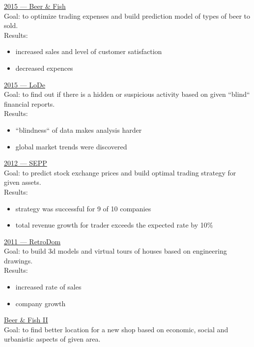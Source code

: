 \documentclass[a4paper,10pt,fullpage]{article}
\begin{document}
\underline{2015 --- Beer \& Fish}\\
Goal: to optimize trading expenses and build prediction model of types of beer 
to sold.\\
Results:
\begin{itemize}
	\item increased sales and level of customer satisfaction
	\item decreased expences\\
\end{itemize}

\underline{2015 --- LoDe}\\
Goal: to find out if there is a hidden or suspicious activity  based on given 
``blind`` financial reports.\\
Results:
\begin{itemize}
	\item ``blindness`` of data makes analysis harder
	\item global market trends were discovered\\
\end{itemize}

\underline{2012 --- SEPP}\\
Goal: to predict stock exchange prices and build optimal trading strategy for 
given assets.\\
Results: 
\begin{itemize}
	\item strategy was successful for 9 of 10 companies
	\item total revenue growth for trader exceeds the expected rate by 10\%\\
\end{itemize}


\underline{2011 --- RetroDom}\\
Goal: to build 3d models and virtual tours of houses based on engineering 
drawings.\\
Results: 
\begin{itemize}
	\item increased rate of sales
	\item company growth\\
\end{itemize}

\underline{Beer \& Fish II}\\
Goal: to find better location for a new shop based on economic, social and 
urbanistic aspects of given area.\\
\end{document}
